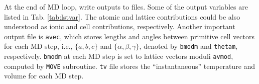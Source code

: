 At the end of MD loop, write outputs to files.
Some of the output variables are listed in Tab. \ref{tab:lstvar}.
The atomic and lattice contributions could be also understood as
ionic and cell contributions, respectively. Another
important output file is \texttt{avec}, which stores lengths and angles
between primitive cell vectors for each MD step, i.e.,
$\{a, b, c\}$ and $\{\alpha, \beta, \gamma\}$,
denoted by \texttt{bmodm} and
\texttt{thetam}, respectively.
\texttt{bmodm} at each MD step
is set to lattice vectors moduli \texttt{avmod}, computed by \texttt{MOVE} subroutine.
\texttt{tv} file stores the ``instantaneous'' temperature and volume
for each MD step.
